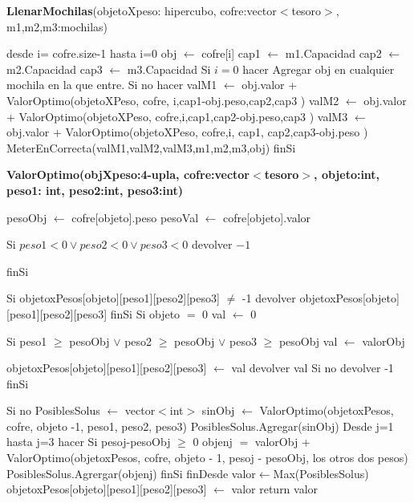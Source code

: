 \documentclass[spanish,12pt]{article}
\begin{document}
{\begin{algorithm}[H]{\textbf{LlenarMochilas}(objetoXpeso: hipercubo, cofre:vector$<$tesoro$>$, m1,m2,m3:mochilas)}
	\begin{algorithmic}[1]
		\State desde i= cofre.size-1 hasta i=0
			\State \quad obj $\gets$ cofre[i]
			\State \quad cap1 $\gets$ m1.Capacidad
			\State \quad cap2 $\gets$ m2.Capacidad
			\State \quad cap3 $\gets$ m3.Capacidad
			\State \quad Si $i=0$ hacer
				\State \quad \quad Agregar obj en cualquier mochila en la que entre.
			\State \quad Si no hacer
				\State \quad \quad valM1 $\gets$ obj.valor + ValorOptimo(objetoXPeso, cofre, i,cap1-obj.peso,cap2,cap3 )
				\State \quad \quad valM2 $\gets$ obj.valor + ValorOptimo(objetoXPeso, cofre,i,cap1,cap2-obj.peso,cap3 )
				\State \quad \quad valM3 $\gets$ obj.valor + ValorOptimo(objetoXPeso, cofre,i, cap1, cap2,cap3-obj.peso )
				\State \quad \quad  MeterEnCorrecta(valM1,valM2,valM3,m1,m2,m3,obj)
			\State \quad finSi

	\end{algorithmic}
\end{algorithm}




\begin{algorithm}[H]{\textbf{ValorOptimo(objXpeso:4-upla, cofre:vector$<$tesoro$>$, objeto:int, peso1: int, peso2:int, peso3:int)}}
	\begin{algorithmic}[1]
		\State  pesoObj $\gets$ cofre[objeto].peso
		\State  pesoVal $\gets$ cofre[objeto].valor

		\State Si $peso1 < 0 \vee peso2 < 0 \vee peso3 < 0$
			\State \quad devolver $-1$

		\State finSi

		\State Si objetoxPesos[objeto][peso1][peso2][peso3] $\neq$ -1
			\State \quad devolver objetoxPesos[objeto][peso1][peso2][peso3]
		\State finSi
		\State Si objeto $=$ 0
			\State \quad val $\gets$ 0

			\State \quad Si peso1 $\ge$ pesoObj $\vee$ peso2 $\ge$ pesoObj $\vee$ peso3 $\ge$ pesoObj
				\State\quad \quad  val $\gets$ valorObj

				\State \quad \quad objetoxPesos[objeto][peso1][peso2][peso3] $\gets$ val
				\State \quad \quad devolver val
			\State \quad Si no
				\State \quad \quad devolver -1 %
			\State \quad finSi

		\State Si no
			\State \quad PosiblesSolus $\gets$ vector$<$int$>$
			\State \quad sinObj $\gets$ ValorOptimo(objetoxPesos, cofre, objeto -1, peso1, peso2, peso3)
			\State \quad PosiblesSolus.Agregar(sinObj)
			\State \quad Desde j=1 hasta j=3 hacer
				\State \quad \quad Si pesoj-pesoObj $\ge$ 0
					\State \quad \quad \quad objenj $=$ valorObj + ValorOptimo(objetoxPesos, cofre, objeto - 1, pesoj - pesoObj, los otros dos pesos)
					\State \quad \quad \quad PosiblesSolus.Agrergar(objenj)
				\State \quad \quad finSi
			\State \quad finDesde
			\State \quad  valor$\gets$Max(PosiblesSolus)
			\State \quad objetoxPesos[objeto][peso1][peso2][peso3] $\gets$ valor
			\State \quad return valor
		\EndIf



\end{algorithmic}
\end{algorithm}}
\end{document}
